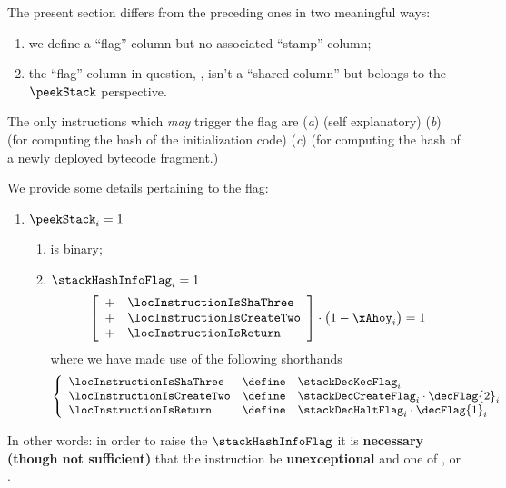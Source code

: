 The present section differs from the preceding ones in two meaningful ways:
\begin{enumerate}
        \item we define a ``flag'' column but no associated ``stamp'' column;
	\item the ``flag'' column in question, \stackHashInfoFlag{}, isn't a ``shared column'' but belongs to the $\peekStack$ perspective.
\end{enumerate}
The only instructions which \emph{may} trigger the \stackHashInfoFlag{} flag are
(\emph{a})     (self explanatory)
(\emph{b})  (for computing the  hash of the initialization code)
(\emph{c})   (for computing the  hash of a newly deployed bytecode fragment.)

We provide some details pertaining to the \stackHashInfoFlag{} flag: 
\begin{enumerate}[resume]
	\item \If $\peekStack_{i} = 1$ \Then
		\begin{enumerate}
			\item \stackHashInfoFlag{} is binary;
			\item \If $\stackHashInfoFlag_{i} = 1$ \Then
				\[
					\left[ \begin{array}{cl}
						+ & \locInstructionIsShaThree  \\
						+ & \locInstructionIsCreateTwo \\
						+ & \locInstructionIsReturn    \\
					\end{array} \right]
					\cdot \big(1 - \xAhoy_{i} \big)
					= 1
				\]
				where we have made use of the following shorthands
				\[
					\left\{ \begin{array}{lcl}
						\locInstructionIsShaThree  & \define & \stackDecKecFlag    _{i}                       \\
						\locInstructionIsCreateTwo & \define & \stackDecCreateFlag _{i} \cdot \decFlag{2}_{i} \\
						\locInstructionIsReturn    & \define & \stackDecHaltFlag   _{i} \cdot \decFlag{1}_{i} \\
					\end{array} \right.
				\]
		\end{enumerate}
\end{enumerate}
\saNote{} 
In other words: in order to raise the $\stackHashInfoFlag$ it is \textbf{necessary (though not sufficient)} that the instruction be \textbf{unexceptional} and one of ,  or .

